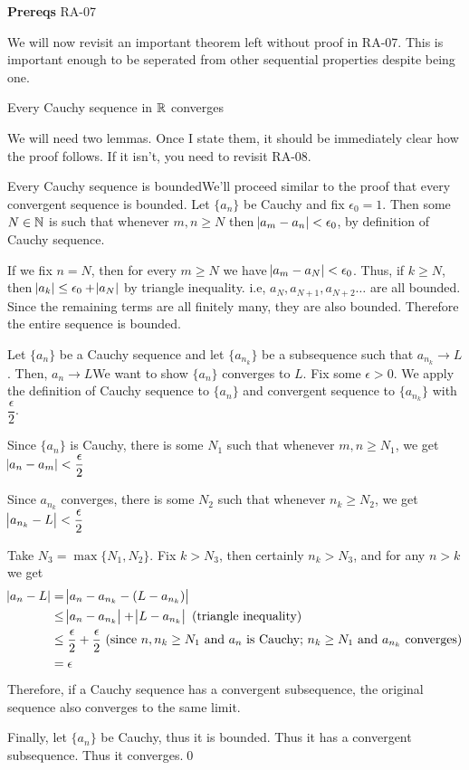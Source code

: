 

\textbf{Prereqs} RA-07

We will now revisit an important theorem left without proof in RA-07. This is important enough to be seperated from other sequential properties despite being one.

\begin{SNP}{\thm}Every Cauchy sequence in $\mathbb{R}$ converges
\end{SNP}

We will need two lemmas. Once I state them, it should be immediately clear how the proof follows. If it isn't, you need to revisit RA-08.

\begin{SWP}{\lm}{Every Cauchy sequence is bounded}We'll proceed similar to the proof that every convergent sequence is bounded. Let $\{a_n\}$ be Cauchy and fix $\epsilon_0 = 1$. Then some $N \in \mathbb{N}$ is such that whenever $m, n \geq N$ then $\abs{a_m - a_n} < \epsilon_0$, by definition of Cauchy sequence.

If we fix $n = N$, then for every $m \geq N$ we have $\abs{a_m - a_N} < \epsilon_0$. Thus, if $k \geq N$, then $\abs{a_k} \leq \epsilon_0 + \abs{a_N}$ by triangle inequality. i.e, $a_N, a_{N + 1}, a_{N + 2} \dots$ are all bounded. Since the remaining terms are all finitely many, they are also bounded. Therefore the entire sequence is bounded.
\end{SWP}
\begin{SWP}{\lm}{Let $\{a_n\}$ be a Cauchy sequence and let $\{a_{n_k}\}$ be a subsequence such that $a_{n_k} \rightarrow L$. Then, $a_n \rightarrow L$}We want to show $\{a_n\}$ converges to $L$. Fix some $\epsilon > 0$. We apply the definition of Cauchy sequence to $\{a_n\}$ and convergent sequence to $\{a_{n_k}\}$ with $\dfrac{\epsilon}{2}$.

Since $\{a_n\}$ is Cauchy, there is some $N_1$ such that whenever $m, n \geq N_1$, we get $\abs{a_n - a_m} < \dfrac{\epsilon}{2}$

Since $a_{n_k}$ converges, there is some $N_2$ such that whenever $n_k \geq N_2$, we get $\abs{a_{n_k} - L} < \dfrac{\epsilon}{2}$

Take $N_3 = \max \{N_1, N_2\}$. Fix $k > N_3$, then certainly $n_k > N_3$, and for any $n > k$ we get
\begin{align*}
\abs{a_n - L} &= \abs{a_n - a_{n_k} - (L - {a_{n_k}})}\\
			  &\leq \abs{a_n - a_{n_k}} + \abs{L - a_{n_k}} \text{ (triangle inequality)}\\
			  &\leq \dfrac{\epsilon}{2} + \dfrac{\epsilon}{2} \text{ (since } n, n_k \geq N_1 \text{ and } a_n \text{ is Cauchy; $n_k \geq N_1$ and $a_{n_k}$ converges)}\\
			  &= \epsilon
\end{align*}
Therefore, if a Cauchy sequence has a convergent subsequence, the original sequence also converges to the same limit.
\end{SWP}

Finally, let $\{a_n\}$ be Cauchy, thus it is bounded. Thus it has a convergent subsequence. Thus it converges.\qed

